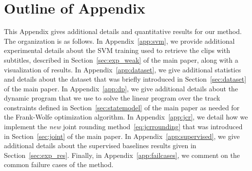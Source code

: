 \documentclass[10pt,twocolumn,letterpaper]{article}
\begin{document}
%
\clearpage
\appendix
\normalsize
\section*{Outline of Appendix}
%
This Appendix gives additional details and quantitative results for our method.
The organization is as follows.
In Appendix~\ref{app:svm}, we provide additional experimental details about the SVM training used to retrieve the clips with subtitles, described in Section~\ref{sec:exp_weak} of the main paper, along with a visualization of results.
In Appendix~\ref{app:dataset}, we give additional statistics and details about the dataset that was briefly introduced in Section~\ref{sec:dataset} of the main paper.
In Appendix~\ref{app:dp}, we give additional details about the dynamic program that we use to solve the linear program over the track constraints defined in Section~\ref{sec:statemodel} of the main paper as needed for the Frank-Wolfe optimization algorithm.
In Appendix~\ref{app:jcr}, we detail how we implement the \emph{new} joint rounding method~\eqref{eq:jcrrounding} that was introduced in Section~\ref{sec:joint} of the main paper.
In Appendix~\ref{app:supervised}, we give additional details about the supervised baselines results given in Section~\ref{sec:exp_res}.
Finally, in Appendix~\ref{app:failcases}, we comment on the common failure cases of the method.




%




%


%





\end{document}
